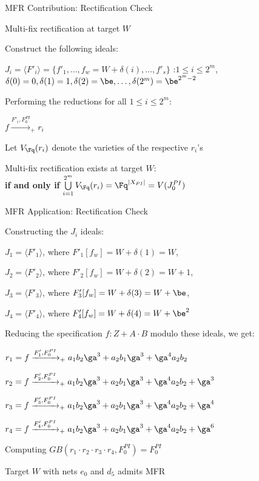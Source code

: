 \begin{frame}{\large MFR Contribution: Rectification Check}
\bi
	\item Multi-fix rectification at target $W$
	\vspace{0.1in}
	\bi
		\item Construct the following ideals:
		\bi
			\item {\small $J_i = \langle F'_i\rangle =\{f'_1,\dots,f_w=W+\delta(i),\dots,f'_s\}$}
				:$1 \leq i \leq 2^m$, $\delta(0)=0, \delta(1)=1,\delta(2)=\be,\dots,\delta(2^m)= \be^{2^m-2}$
		\ei
		\vspace{0.1in}
		\item Performing the reductions for all $1 \leq i \leq 2^m$: 
		\bi
			\item $f\xrightarrow{F'_i, F_{0}^{PI}}_+r_i $
		\ei
		\item Let $V_{\Fq}(r_i)$ denote the varieties of the respective $r_i$'s
		\vspace{0.1in}
		\item Multi-fix rectification exists at target $W$: \\ 
				\centering
				{\bf if and only if} $\bigcup\limits_{i=1}^{2^m}V_{\Fq}(r_i) = \Fq^{|X_{PI}|} = V(J_0^{PI})$
	\ei
\ei
\end{frame}

\begin{frame}{\large MFR Application: Rectification Check}
\bi
	\item Constructing the $J_i$ ideals:
	\bi
		\item {\small$J_1 = \langle F'_1\rangle$, where $F'_1[f_w]=W+\delta(1)=W$},
		\item {\small$J_2 = \langle F'_2\rangle$, where $F'_2[f_w]=W+\delta(2)=W+1$},
		\item {\small$J_3 = \langle F'_3\rangle$, where $F'_3[f_w]=W+\delta(3)=W+\be$},
		\item {\small$J_4 = \langle F'_4\rangle$, where $F'_4[f_w]=W+\delta(4)=W+\be^2$}
	\ei
	\vspace{0.1in}
	\item Reducing the specification $f: Z+A\cdot B$ modulo these ideals, we get:
	\bi
		\item $r_1 = f \xrightarrow[]{F'_1,F_{0}^{PI}}_+{a_1b_2\ga^3+a_2b_1\ga^3+\ga^4a_2b_2}$
		\item $r_2 = f \xrightarrow[]{F'_2,F_{0}^{PI}}_+{a_1b_2\ga^3+a_2b_1\ga^3+\ga^4a_2b_2+\ga^3}$
		\item $r_3 = f \xrightarrow[]{F'_3,F_{0}^{PI}}_+{a_1b_2\ga^3+a_2b_1\ga^3+\ga^4a_2b_2+\ga^4}$
		\item $r_4 = f \xrightarrow[]{F'_4,F_{0}^{PI}}_+{a_1b_2\ga^3+a_2b_1\ga^3+\ga^4a_2b_2+\ga^6}$
	\ei
	\item Computing $GB(r_1\cdot r_2 \cdot r_3 \cdot r_4, F_{0}^{PI})=F_{0}^{PI}$
	\item Target $W$ with nets $e_0$ and $d_5$ admits MFR
\ei
\end{frame}

